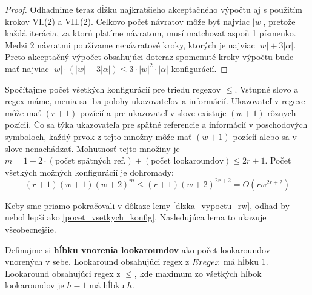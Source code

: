 \begin{proof}
Odhadnime teraz dĺžku najkratšieho akceptačného výpočtu aj s použitím krokov VI.(2) a VII.(2). Celkovo počet návratov môže byť najviac $|w|$, pretože každá iterácia, za ktorú platíme návratom, musí matchovať aspoň 1 písmenko. Medzi 2 návratmi používame nenávratové kroky, ktorých je najviac $|w|+3|\alpha|$. Preto akceptačný výpočet obsahujúci doteraz spomenuté kroky výpočtu bude mať najviac $|w|\cdot(|w|+3|\alpha|) \leq 3\cdot|w|^2\cdot|\alpha|$ konfigurácií.
\end{proof}

Spočítajme počet všetkých konfigurácií pre triedu regexov $\le$. Vstupné slovo a regex máme, menia sa iba polohy ukazovateľov a informácií. Ukazovateľ v regexe môže mať $(r+1)$ pozícií a pre ukazovateľ v slove existuje $(w+1)$ rôznych pozícií. Čo sa týka ukazovateľa pre spätné referencie a informácií v poschodových symboloch, každý prvok z tejto množny môže mať $(w+1)$ pozícií alebo sa v slove nenachádzať. Mohutnosť tejto množiny je $m = 1+2\cdot(\text{počet spätných ref.})+(\text{počet lookaroundov})\leq 2r+1$. Počet všetkých možných konfigurácií je dohromady: 
\begin{equation}\label{pocet_vsetkych_konfig}
(r+1)(w+1)(w+2)^m \leq (r+1)(w+2)^{2r+2} = O(rw^{2r+2})
\end{equation}

Keby sme priamo pokračovali v dôkaze lemy \ref{dlzka_vypoctu_rw}, odhad by nebol lepší ako \ref{pocet_vsetkych_konfig}. Nasledujúca lema to ukazuje všeobecnejšie.

Definujme si \textbf{hĺbku vnorenia lookaroundov} ako počet lookaroundov vnorených v sebe. Lookaround obsahujúci regex z $Eregex$ má hĺbku 1. Lookaround obsahujúci regex z $\le$, kde maximum zo všetkých hĺbok lookaroundov je $h-1$ má hĺbku $h$.


